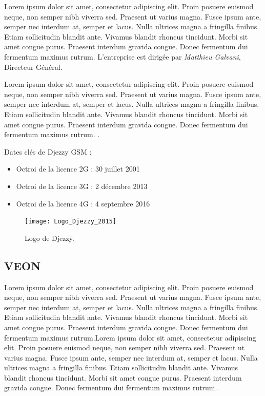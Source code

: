 Lorem ipsum dolor sit amet, consectetur adipiscing elit. Proin posuere euismod neque, non semper nibh viverra sed. Praesent ut varius magna. Fusce ipsum ante, semper nec interdum at, semper et lacus. Nulla ultrices magna a fringilla finibus. Etiam sollicitudin blandit ante. Vivamus blandit rhoncus tincidunt. Morbi sit amet congue purus. Praesent interdum gravida congue. Donec fermentum dui fermentum maximus rutrum. L'entreprise est dirigée par \textit{Matthieu Galvani}, Directeur Général.

\medskip

Lorem ipsum dolor sit amet, consectetur adipiscing elit. Proin posuere euismod neque, non semper nibh viverra sed. Praesent ut varius magna. Fusce ipsum ante, semper nec interdum at, semper et lacus. Nulla ultrices magna a fringilla finibus. Etiam sollicitudin blandit ante. Vivamus blandit rhoncus tincidunt. Morbi sit amet congue purus. Praesent interdum gravida congue. Donec fermentum dui fermentum maximus rutrum. \parencite{djezzy_propos_2019}.

Dates clés de Djezzy GSM :
\begin{itemize}
  \item  Octroi de la licence 2G : 30 juillet 2001
  \item  Octroi de la licence 3G : 2 décembre 2013
  \item  Octroi de la licence 4G : 4 septembre 2016
\end{itemize}


\begin{figure}[hbt!]
  \centering
  \texttt{[image: Logo\_Djezzy\_2015]}
  \caption{Logo de Djezzy.}
  \label{fig:logo-djezzy}
\end{figure}
\FloatBarrier

\subsection{VEON}
Lorem ipsum dolor sit amet, consectetur adipiscing elit. Proin posuere euismod neque, non semper nibh viverra sed. Praesent ut varius magna. Fusce ipsum ante, semper nec interdum at, semper et lacus. Nulla ultrices magna a fringilla finibus. Etiam sollicitudin blandit ante. Vivamus blandit rhoncus tincidunt. Morbi sit amet congue purus. Praesent interdum gravida congue. Donec fermentum dui fermentum maximus rutrum.Lorem ipsum dolor sit amet, consectetur adipiscing elit. Proin posuere euismod neque, non semper nibh viverra sed. Praesent ut varius magna. Fusce ipsum ante, semper nec interdum at, semper et lacus. Nulla ultrices magna a fringilla finibus. Etiam sollicitudin blandit ante. Vivamus blandit rhoncus tincidunt. Morbi sit amet congue purus. Praesent interdum gravida congue. Donec fermentum dui fermentum maximus rutrum.\parencite{djezzy_propos_2019}.

